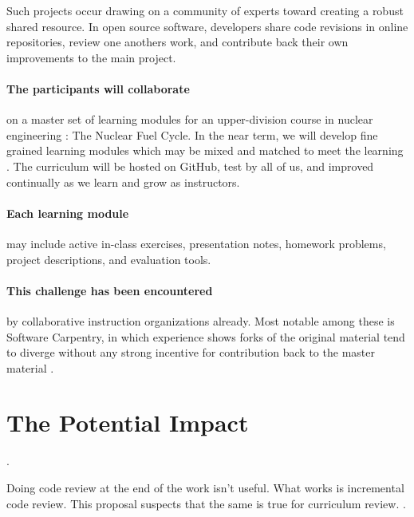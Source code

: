 \documentclass[11pt]{article}
\begin{document}
          Such projects occur drawing on a community of experts toward 
          creating a robust shared resource. In open source software, 
          developers share code revisions in online repositories, review one 
          anothers work, and contribute back their own improvements to the main 
          project. 


          \paragraph{The participants will collaborate} on a master set of learning 
          modules for an upper-division course in nuclear engineering : 
          The Nuclear Fuel Cycle. In the near term, we will develop fine 
          grained learning modules which may be mixed and matched to meet the 
          learning . The curriculum will be hosted on GitHub, 
          test by all of us, and improved continually as we learn and grow as 
          instructors. 

          \paragraph{Each learning module} may include active in-class exercises, 
          presentation notes, homework problems, project descriptions, and 
          evaluation tools. 

          \paragraph{This challenge has been encountered} by collaborative 
          instruction organizations already. Most notable among these is 
          Software Carpentry, in which experience shows 
          \cite{wilson_lessons_2014} forks of the original material tend to diverge 
          without any strong incentive for contribution back to the master 
          material \cite{wilson_software_2014}.


          \section{The Potential Impact}
          \cite{wilson_software_2014}.

          Doing code review at the end of the work isn't useful. What works is 
          incremental code review. This proposal suspects that the same is true 
          for curriculum review. 
          \cite{wilson_software_2014}.
\end{document}
